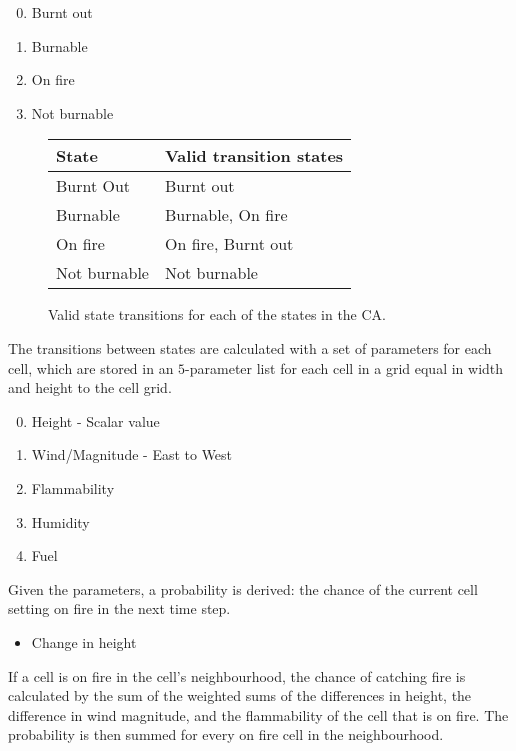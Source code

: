 \documentclass[11pt, a4paper, titlepage]{article}
\begin{document}
\begin{enumerate}
  \setcounter{enumi}{-1}
  \item Burnt out
  \item Burnable
  \item On fire
  \item Not burnable
\end{enumerate}


\begin{figure}[h]
  \centering
    \begin{tabular}{ || l | l ||}
      \hline
      \textbf{State}            &  \textbf{Valid transition states}  \\ 
      \hline
      Burnt Out        &  Burnt out           \\       
      Burnable         &  Burnable, On fire   \\
      On fire          &  On fire, Burnt out  \\   
      Not burnable     &  Not burnable        \\
      \hline
 
    \end{tabular}
  \caption{Valid state transitions for each of the states in the CA.}
  \label{Valid state transitions}
\end{figure}


The transitions between states are calculated with a set of parameters for each cell, which are stored in an $5$-parameter list for each cell in a grid equal in width and height to the cell grid. 

\begin{enumerate}
  \setcounter{enumi}{-1}
  \item Height - Scalar value
  \item Wind/Magnitude - East to West
  \item Flammability
  \item Humidity
  \item Fuel
\end{enumerate}



Given the parameters, a probability is derived: the chance of the current cell setting on fire in the next time step.



\begin{itemize}
  \item Change in height
\end{itemize}
If a cell is on fire in the cell's neighbourhood, the chance of catching fire is calculated by the sum of the weighted sums of the differences in height, the difference in wind magnitude, and the flammability of the cell that is on fire. The probability is then summed for every on fire cell in the neighbourhood.
\end{document}
